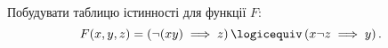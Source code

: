 %
%
^^I^^IПобудувати таблицю істинності для функції $F$:
^^I^^I\[
^^I^^I^^IF(x, y, z) = \left( \neg{(xy)} \implies z\right) \logicequiv \left( x \neg{z} \implies y \right).
^^I^^I\]
